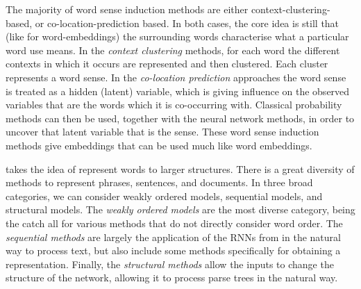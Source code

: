 \documentclass[12pt,parskip]{komatufte}
\begin{document}
The majority of word sense induction methods are either context-clustering-based, or co-location-prediction based.
In both cases, the core idea is still that (like for word-embeddings) the surrounding words characterise what a particular word use means.
In the \emph{context clustering} methods, for each word the different contexts in which it occurs are represented and then clustered.
Each cluster represents a word sense.
In the \emph{co-location prediction} approaches the word sense is treated as a hidden (latent) variable,
which is giving influence on the observed variables that are the words which it is co-occurring with.
Classical probability methods can then be used, together with the neural network methods, in order to uncover that latent variable that is the sense.
These word sense induction methods give embeddings that can be used much like word embeddings.



 takes the idea of represent words to larger structures.
There is a great diversity of methods to represent phrases, sentences, and documents.
In three broad categories, we can consider weakly ordered models, sequential models, and structural models.
The \emph{weakly ordered models} are the most diverse category, being the catch all for various methods that do not directly consider word order.
The \emph{sequential methods} are largely the application of the RNNs from  in the natural way to process text,
but also include some methods specifically for obtaining a representation.
Finally, the \emph{structural methods} allow the inputs to change the structure of the network,
allowing it to process parse trees in the natural way.
\end{document}
